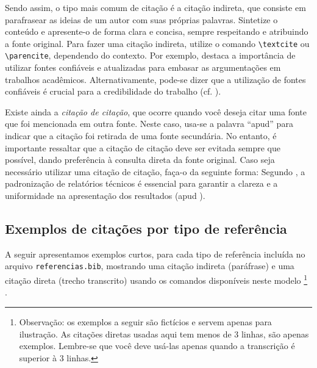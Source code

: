 Sendo assim, o tipo mais comum de citação é a citação indireta,
que consiste em parafrasear as ideias de um autor com suas próprias palavras. Sintetize o conteúdo e
apresente-o de forma clara e concisa, sempre respeitando e atribuindo a fonte original.
Para fazer uma citação indireta, utilize o comando \texttt{\textbackslash textcite} ou
\texttt{\textbackslash parencite}, dependendo do contexto. Por exemplo, \textcite{silva2020} destaca a importância de
utilizar fontes confiáveis e atualizadas para embasar as argumentações em trabalhos acadêmicos.
Alternativamente, pode-se dizer que a utilização de fontes confiáveis é crucial para a credibilidade
do trabalho (cf. \parencite{silva2020}).

Existe ainda a \emph{citação de citação}, que ocorre quando você deseja citar uma fonte que foi
mencionada em outra fonte. Neste caso, usa-se a palavra ``apud'' para indicar que a citação foi
retirada de uma fonte secundária. No entanto, é importante ressaltar que a citação de citação deve
ser evitada sempre que possível, dando preferência à consulta direta da fonte original. Caso seja
necessário utilizar uma citação de citação, faça-o da seguinte forma: Segundo \textcite[p. 45]{rodrigues2017}, a padronização de relatórios técnicos é essencial para garantir a clareza e a uniformidade na apresentação dos resultados (apud \textcite{lima2022}).

\subsection{Exemplos de citações por tipo de referência}

A seguir apresentamos exemplos curtos, para cada tipo de referência incluída no arquivo
\texttt{referencias.bib}, mostrando uma citação indireta (paráfrase) e uma citação direta (trecho
transcrito) usando os comandos disponíveis neste modelo%
\footnote{Observação: os exemplos a seguir são fictícios e servem apenas para ilustração. As
    citações diretas usadas aqui tem menos de 3 linhas, são apenas exemplos. Lembre-se que você deve
    usá-las apenas quando a transcrição é superior à 3 linhas.}%
.

